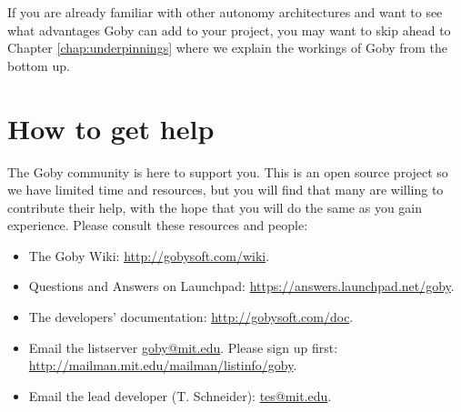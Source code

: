 If you are already familiar with other \glspl{autonomy architecture} and want to see what advantages Goby can add to your project, you may want to skip ahead to Chapter \ref{chap:underpinnings} where we explain the workings of Goby from the bottom up.

\section{How to get help}
The Goby community is here to support you. This is an open source project so we have limited time and resources, but you will find that many are willing to contribute their help, with the hope that you will do the same as you gain experience. Please consult these resources and people:

\begin{itemize}
\item The Goby Wiki: \url{http://gobysoft.com/wiki}.
\item Questions and Answers on Launchpad: \url{https://answers.launchpad.net/goby}.
\item The developers' documentation: \url{http://gobysoft.com/doc}.
\item Email the listserver \href{mailto:goby@mit.edu}{goby@mit.edu}. Please sign up first: \url{http://mailman.mit.edu/mailman/listinfo/goby}.
\item Email the lead developer (T. Schneider): \href{mailto:tes@mit.edu}{tes@mit.edu}.
\end{itemize}

